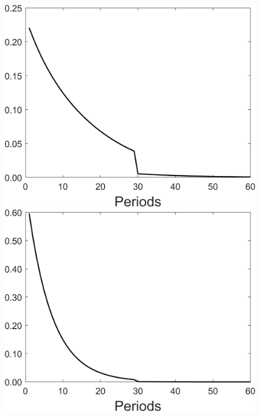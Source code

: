 \begin{figure}[h!!]
\begin{minipage}[]{0.32\textwidth}
	\end{minipage}
	\begin{minipage}[]{0.32\textwidth}
		\includegraphics[width=1\textwidth]{../codding_model/Own/figures/Rep_agent/staticonlyRam_separate_hl_periods59_eppsilon4.00_zeta1.40_Ad08_Ac04_thetac0.70_thetad0.56_HetGrowth1_tauul0.181_util0_withtarget1_lgd0.png}
	\end{minipage}
	\begin{minipage}[]{0.32\textwidth}
		\includegraphics[width=1\textwidth]{../codding_model/Own/figures/Rep_agent/staticonlyRam_separate_yc_periods59_eppsilon4.00_zeta1.40_Ad08_Ac04_thetac0.70_thetad0.56_HetGrowth1_tauul0.181_util0_withtarget1_lgd0.png}

\end{minipage}
\end{figure}
